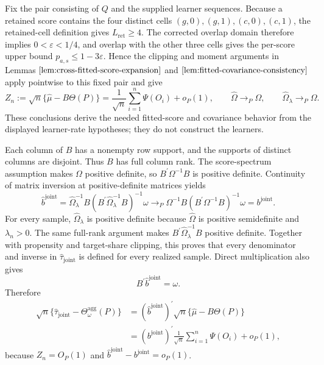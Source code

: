 Fix the pair consisting of \(Q\) and the supplied learner sequences. Because a retained score contains the four distinct cells \((g,0),(g,1),(c,0),(c,1)\), the retained-cell definition gives \(L_{\mathrm{ret}}\ge4\). The corrected overlap domain therefore implies \(0<\varepsilon<1/4\), and overlap with the other three cells gives the per-score upper bound \(p_{a,s}\le1-3\varepsilon\). Hence the clipping and moment arguments in Lemmas \(\ref{lem:cross-fitted-score-expansion}\) and \(\ref{lem:fitted-covariance-consistency}\) apply pointwise to this fixed pair and give
\[
Z_n:=\sqrt n\{\widehat\mu-B\Theta(P)\}
=\frac1{\sqrt n}\sum_{i=1}^n\Psi(O_i)+o_P(1),
\qquad
\widehat\Omega\to_P\Omega,
\qquad
\widehat\Omega_\lambda\to_P\Omega.
\]
These conclusions derive the needed fitted-score and covariance behavior from the displayed learner-rate hypotheses; they do not construct the learners.

Each column of \(B\) has a nonempty row support, and the supports of distinct columns are disjoint. Thus \(B\) has full column rank. The score-spectrum assumption makes \(\Omega\) positive definite, so \(B^{\prime}\Omega^{-1}B\) is positive definite. Continuity of matrix inversion at positive-definite matrices yields
\[
\widehat b^{\mathrm{joint}}
=\widehat\Omega_\lambda^{-1}B
 (B^{\prime}\widehat\Omega_\lambda^{-1}B)^{-1}\omega
\to_P
\Omega^{-1}B(B^{\prime}\Omega^{-1}B)^{-1}\omega
=b^{\mathrm{joint}}.
\]
For every sample, \(\widehat\Omega_\lambda\) is positive definite because \(\widehat\Omega\) is positive semidefinite and \(\lambda_n>0\). The same full-rank argument makes \(B^{\prime}\widehat\Omega_\lambda^{-1}B\) positive definite. Together with propensity and target-share clipping, this proves that every denominator and inverse in \(\widehat\tau_{\mathrm{joint}}\) is defined for every realized sample. Direct multiplication also gives
\[
B^{\prime}\widehat b^{\mathrm{joint}}=\omega.
\]
Therefore
\[
\begin{aligned}
\sqrt n\{\widehat\tau_{\mathrm{joint}}-\Theta_\omega^{\mathrm{agg}}(P)\}
&=(\widehat b^{\mathrm{joint}})^{\prime}
  \sqrt n\{\widehat\mu-B\Theta(P)\}\\
&=(b^{\mathrm{joint}})^{\prime}\frac1{\sqrt n}
  \sum_{i=1}^n\Psi(O_i)+o_P(1),
\end{aligned}
\]
because \(Z_n=O_P(1)\) and \(\widehat b^{\mathrm{joint}}-b^{\mathrm{joint}}=o_P(1)\).


